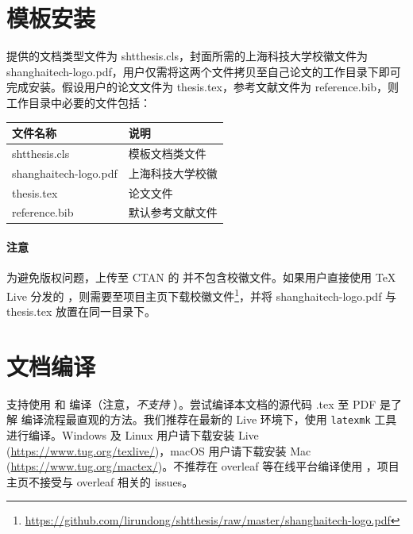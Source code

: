 \documentclass[bachelor, comfort]{shtthesis}
\begin{document}
\section{模板安装}
\shtthesis 提供的文档类型文件为 shtthesis.cls，封面所需的上海科技大学校徽文件为 shanghaitech-logo.pdf，用户仅需将这两个文件拷贝至自己论文的工作目录下即可完成安装。假设用户的论文文件为 thesis.tex，参考文献文件为 reference.bib，则工作目录中必要的文件包括：
\begin{center}
  \begin{tabular}{ll}
    \toprule
    文件名称 & 说明 \\
    \midrule 
    shtthesis.cls & 模板文档类文件 \\
    shanghaitech-logo.pdf & 上海科技大学校徽 \\
    thesis.tex & 论文文件 \\
    reference.bib & 默认参考文献文件 \\
    \bottomrule
  \end{tabular}
\end{center}

\paragraph{注意}
为避免版权问题，上传至 CTAN 的 \shtthesis 并不包含校徽文件。如果用户直接使用 \TeX{} Live 分发的 \shtthesis，则需要至项目主页下载校徽文件\footnote{\url{https://github.com/lirundong/shtthesis/raw/master/shanghaitech-logo.pdf}}，并将 shanghaitech-logo.pdf 与 thesis.tex 放置在同一目录下。

\section{文档编译}
\shtthesis 支持使用  和  编译（注意，\emph{不支持} ）。尝试编译本文档的源代码 \jobname.tex 至 PDF 是了解 \shtthesis 编译流程最直观的方法。我们推荐在最新的  Live 环境下，使用 \verb|latexmk| 工具进行编译。Windows 及 Linux 用户请下载安装  Live (\url{https://www.tug.org/texlive/})，macOS 用户请下载安装 Mac (\url{https://www.tug.org/mactex/})。不推荐在 overleaf 等在线平台编译使用 \shtthesis，项目主页不接受与 overleaf 相关的 issues。
\end{document}
